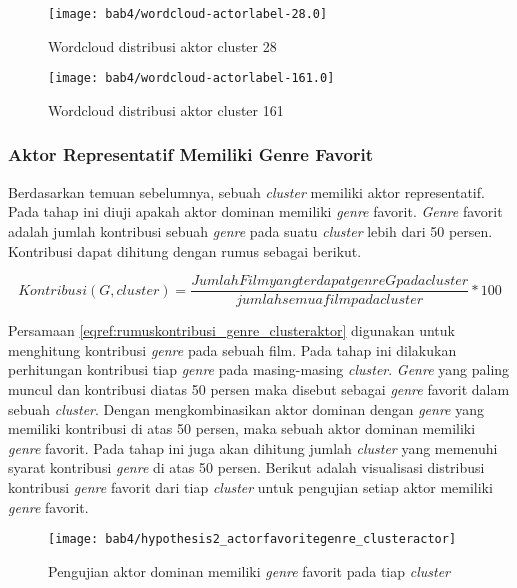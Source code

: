 \begin{figure}[H]
	\centering  
	\texttt{[image: bab4/wordcloud-actorlabel-28.0]}   
	\caption{Wordcloud distribusi aktor cluster 28 }
	\label{fig:wordcloud-actorlabel-28.0} 
\end{figure} 



\begin{figure}[H]
	\centering  
	\texttt{[image: bab4/wordcloud-actorlabel-161.0]}   
	\caption{Wordcloud distribusi aktor cluster 161 }
	\label{fig:wordcloud-actorlabel-161.0} 
\end{figure} 

\subsubsection{ Aktor Representatif Memiliki Genre Favorit}
Berdasarkan temuan sebelumnya, sebuah \textit{cluster} memiliki aktor representatif. Pada tahap ini  diuji apakah aktor dominan memiliki \textit{genre} favorit. \textit{Genre} favorit adalah jumlah kontribusi sebuah \textit{genre} pada suatu \textit{cluster} lebih dari 50 persen. Kontribusi dapat dihitung dengan rumus sebagai berikut. 

\begin{equation}
Kontribusi(G,cluster) = \frac{Jumlah Film yang terdapat genre G pada cluster}{jumlah semua film pada cluster} * 100
\label{eqref:rumuskontribusi_genre_clusteraktor}
\end{equation}

Persamaan \ref{eqref:rumuskontribusi_genre_clusteraktor} digunakan untuk menghitung kontribusi \textit{genre} pada sebuah film. Pada tahap ini dilakukan perhitungan kontribusi tiap \textit{genre} pada masing-masing \textit{cluster}. \textit{Genre} yang paling muncul dan kontribusi diatas 50 persen maka disebut sebagai \textit{genre} favorit dalam sebuah \textit{cluster}. Dengan mengkombinasikan aktor dominan dengan \textit{genre} yang memiliki kontribusi di atas 50 persen, maka sebuah aktor dominan memiliki \textit{genre} favorit. Pada tahap ini juga akan dihitung jumlah \textit{cluster} yang memenuhi syarat kontribusi \textit{genre} di atas 50 persen. Berikut adalah visualisasi distribusi kontribusi \textit{genre} favorit dari tiap \textit{cluster} untuk pengujian setiap aktor memiliki \textit{genre} favorit.


\begin{figure}[H]
	\centering  
	\texttt{[image: bab4/hypothesis2\_actorfavoritegenre\_clusteractor]}   
	\caption{Pengujian aktor dominan memiliki \textit{genre} favorit pada tiap \textit{cluster}}	
\label{fig:hypothesis2_actorfavoritegenre_clusteractor} 
\end{figure}

